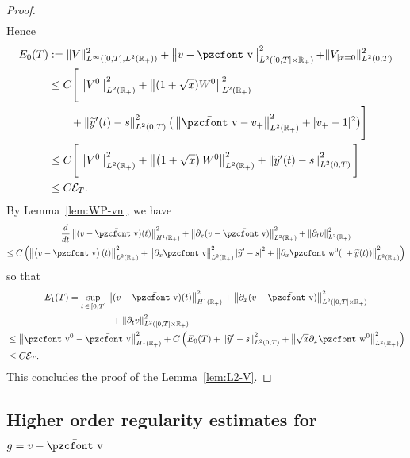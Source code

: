 \documentclass[10pt]{amsart}
\theoremstyle{definition}\newtheorem{defi}[theo]{Definition}\newtheorem{rema}[theo]{Remark}\newtheorem{exam}[theo]{Example}\newtheorem{exem}[theo]{Example}\newtheorem{nota}[theo]{Notation}
\newcommand{\mathpzc}[1]{\text{\pzcfont #1}}
\newcommand{\R}{\mathbb{R}}
\newcommand{\p}{\partial}
\newcommand{\bv}{\bar{\mathpzc{v}}}
\newcommand{\cE}{\mathcal E}
\newcommand{\tv}{\mathpzc{v}}
\newcommand{\tw}{\mathpzc{w}}
\newcommand{\ty}{\widetilde{y}}
\begin{document}
\begin{proof}
\begin{equation}
\begin{aligned}
\end{aligned}
\end{equation}
Hence
\begin{align}\label{eq:est_E0}
E_0(T)& := \|V\|_{L^\infty\left([0,T], L^2(\R_+)\right)}^2 + \left\|v - \bv \right\|_{L^2\left([0,T] \times \R_+\right)}^2 {+ \| V_{|x=0}\|_{L^2(0,T)}^2}\nonumber \\
& \leq C \Bigg[\left\|V^{0}\right\|_{L^2(\R_+)}^2 +
\left\|(1+\sqrt{x}) W^0\right\|_{L^2(\R_+)}^2 \nonumber \\
& \qquad + \left\|\ty'(t)-s\right\|_{L^2(0,T)}^2 \big(\left\|\bv- v_+\right\|_{L^2(\R_+)}^2 + |v_+-1|^2 \big)
\Bigg] \nonumber\\
& \leq C \Bigg[\left\|V^{0}\right\|_{L^2(\R_+)}^2 +
\left\|\left(1+\sqrt{x}\right) W^0\right\|_{L^2(\R_+)}^2 +\left\|\ty'(t)-s\right\|_{L^2(0,T)}^2 \Bigg]
\\
&\leq C \cE_T.
\end{align}
By Lemma~\ref{lem:WP-vn}, we have
\begin{multline*}
\dfrac{d}{dt} \left\|(v-\bv)(t)\right\|_{H^1(\R_+)}^2 + \left\|\partial_x (v-\bv) \right\|_{L^2(\R_+)}^2 + \left\|\partial_t v \right\|_{L^2(\R_+)}^2\\
\leq C \left(\left\|\left(v-\bv\right)(t) \right\|_{L^2(\R_+)}^2 + \left\|\partial_x \bv\right\|_{L^2(\R_+)}^2 \left|\ty' -s\right|^2 + \left\| \partial_x\tw^0(\cdot +\ty(t))\right\|_{L^2(\R_+)}^2\right)
\end{multline*}
so that
\begin{multline}\label{estim-E1}
E_1(T)
= \sup_{t\,\in\,[0,T]} \left\|(v-\bv)(t)\right\|_{H^1(\R_+)}^2 + \left\|\partial_x (v-\bv)\right\|_{L^2\left([0,T] \times \R_+\right)}^2 \\
\begin{aligned}
&\mkern207mu + \left\|\partial_t v \right\|_{L^2\left([0,T] \times \R_+\right)}^2  \\
& \leq
\left\|\tv^0-\bv\right\|_{H^1(\R_+)}^2 + C\left(E_0(T) + \left\|\ty'-s\right\|_{L^2(0,T)}^2+ \left\| \sqrt{x}\p_x \tw^0\right\|_{L^2(\R_+)}^2\right)\\
&\leq C \cE_T.
\end{aligned}
\end{multline}
This concludes the proof of the Lemma~\ref{lem:L2-V}.
\end{proof}



\subsection{Higher order regularity estimates for \texorpdfstring{$g=v-\bv$}{g}}\label{sec:regularity-v}
\end{document}

